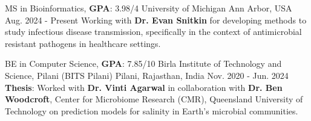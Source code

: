 
\begin{cventries}

  \cventry
    {MS in Bioinformatics, \textbf{GPA}: 3.98/4} %
    {University of Michigan} %
    {Ann Arbor, USA} %
    {Aug. 2024 - Present} %
    {
        Working with \textbf{Dr. Evan Snitkin} for developing methods to study infectious
        disease transmission, specifically in the context of antimicrobial resistant pathogens
        in healthcare settings.
    }

  \cventry
    {BE in Computer Science, \textbf{GPA}: 7.85/10} %
    {Birla Institute of Technology and Science, Pilani (BITS Pilani)} %
    {Pilani, Rajasthan, India} %
    {Nov. 2020 - Jun. 2024} %
    {
      \textbf{Thesis}: Worked with \textbf{Dr. Vinti Agarwal} in collaboration with
      \textbf{Dr. Ben Woodcroft}, Center for Microbiome Research (CMR), Queensland
      University of Technology on prediction models for salinity in Earth’s microbial
      communities.
    }




\end{cventries}
